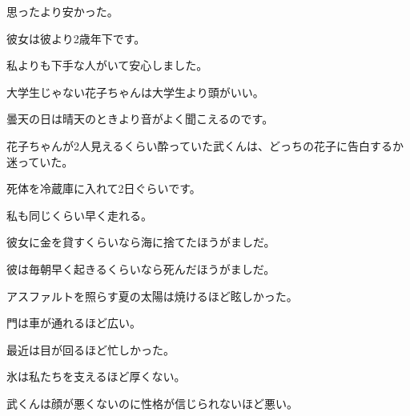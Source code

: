 
\author{Tomislav Mamić}

	
	\begin{mondai}{}
		\Large
		\item 思ったより安かった。
		\item 彼女は彼より2歳年下です。
		\item 私よりも下手な人がいて安心しました。
		\item 大学生じゃない花子ちゃんは大学生より頭がいい。
		\item 曇天の日は晴天のときより音がよく聞こえるのです。
	\end{mondai}

	\begin{mondai}{}
		\Large
		\item 花子ちゃんが2人見えるくらい酔っていた武くんは、どっちの花子に告白するか迷っていた。
		\item 死体を冷蔵庫に入れて2日ぐらいです。
		\item 私も同じくらい早く走れる。
		\item 彼女に金を貸すくらいなら海に捨てたほうがましだ。
		\item 彼は毎朝早く起きるくらいなら死んだほうがましだ。
	\end{mondai}

	\begin{mondai}{}
		\Large
		\item アスファルトを照らす夏の太陽は焼けるほど眩しかった。
		\item 門は車が通れるほど広い。
		\item 最近は目が回るほど忙しかった。
		\item 氷は私たちを支えるほど厚くない。
		\item 武くんは顔が悪くないのに性格が信じられないほど悪い。
	\end{mondai}
